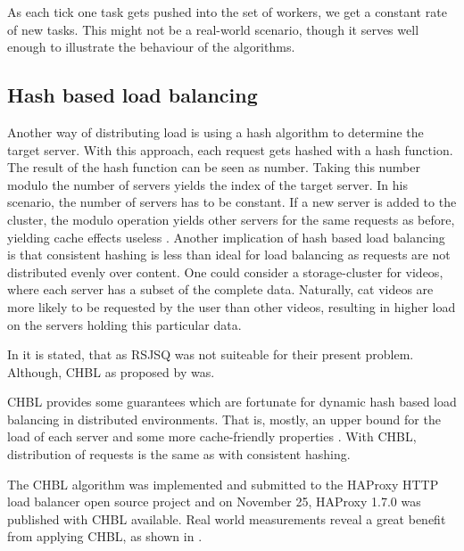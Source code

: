 As each tick one task gets pushed into the set of workers, we get a constant
rate of new tasks. This might not be a real-world scenario, though it serves
well enough to illustrate the behaviour of the algorithms.

\subsection{Hash based load balancing}

Another way of distributing load is using a hash algorithm to determine the
target server.
With this approach, each request gets hashed with a hash function.
The result of the hash function can be seen as number.
Taking this number modulo the number of servers yields the index of the target
server.
In his scenario, the number of servers has to be constant.
If a new server is added to the cluster, the modulo operation yields other
servers for the same requests as before, yielding cache effects useless
\cite{medVimeoEngin}.
Another implication of hash based load balancing is that consistent hashing is
less than ideal for load balancing as requests are not distributed evenly over
content.
One could consider a storage-cluster for videos, where each server has a subset
of the complete data.
Naturally, cat videos are more likely to be requested by the user than other
videos, resulting in higher load on the servers holding this particular data.

In \cite{medVimeoEngin} it is stated, that as \ac{RSJSQ} was not suiteable for
their present problem.
Although, \ac{CHBL} as proposed by \cite{ConsistentHashingWithBoundedLoads} was.

\ac{CHBL} provides some guarantees which are fortunate for dynamic hash based
load balancing in distributed environments.
That is, mostly, an upper bound for the load of each server
\cite{ConsistentHashingWithBoundedLoads}
and some more cache-friendly properties \cite{medVimeoEngin}.
With \ac{CHBL}, distribution of requests is the same as with consistent hashing.

The \ac{CHBL} algorithm was implemented and submitted to the HAProxy HTTP load
balancer open source project and on November 25, HAProxy 1.7.0 was published
with \ac{CHBL} available.
Real world measurements reveal a great benefit from applying \ac{CHBL}, as shown
in \cite{medVimeoEngin}.


